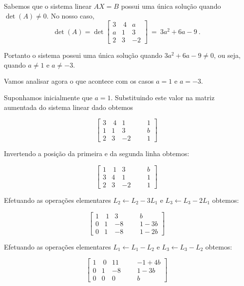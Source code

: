 \begin{solution}
Sabemos que o sistema linear $AX=B$ possui uma única solução quando $\det(A) \neq 0$. No nosso caso,
$$ \det(A) = \det\left[\begin{array}{rrr}
  3 & \ 4 &    a  \\
  a &   1 &    3  \\ 
  2 &   3 &   -2  \end{array}\right]\ =\ 3a^2 + 6a - 9 \ . $$

Portanto o sistema possui uma única solução quando $3a^2 + 6a - 9 \neq 0$, ou seja, quando $a\neq 1$ e $a\neq -3$.

\bigskip
Vamos analisar agora o que acontece com os casos $a=1$ e $a=-3$.

\bigskip
Suponhamos inicialmente que $a=1$. Substituindo este valor na matriz aumentada do sistema linear dado obtemos

$$ \left[\begin{array}{rrrr|rr}
  3 & \ 4 &    1  & & &   1  \\
  1 &   1 &    3  & & &   b  \\ 
  2 &   3 &   -2  & & &   1  \end{array}\right] $$

Invertendo a posição da primeira e da segunda linha obtemos:

$$ \left[\begin{array}{rrrr|rr}
  1 & \ 1 &    3  & & &   b  \\ 
  3 &   4 &    1  & & &   1  \\
  2 &   3 &   -2  & & &   1  \end{array}\right] $$

Efetuando as operações elementares $L_2 \leftarrow L_2 - 3L_1$  e  $L_3 \leftarrow L_3 - 2L_1$ obtemos:

$$ \left[\begin{array}{rrrr|rc}
  1 & \ 1 &    3  & & &   b  \\ 
  0 &   1 &   -8  & & &   1-3b  \\
  0 &   1 &   -8  & & &   1-2b  \end{array}\right] $$

Efetuando as operações elementares $L_1 \leftarrow L_1 - L_2$  e   $L_3 \leftarrow L_3 - L_2$ obtemos:

$$ \left[\begin{array}{rrrr|rc}
  1 & \ 0 &   11  & & &  -1+4b     \\ 
  0 &   1 &   -8  & & &   1-3b  \\
  0 &   0 &    0  & & &   b     \end{array}\right] $$


\end{solution}
